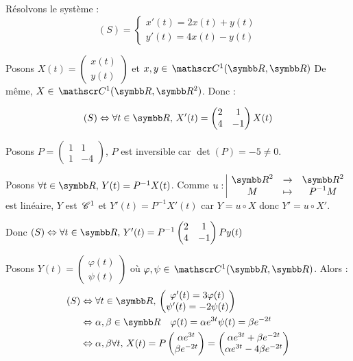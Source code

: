 \begin{exemple}
    Résolvons le système :
    \[(S) = \begin{cases}
        x'(t) = 2x(t) + y(t) \\
        y'(t) = 4x(t) - y(t)
    \end{cases}\]

    Posons $X(t) = \begin{pmatrix} x(t) \\ y(t) \end{pmatrix}$ et $x, y \in \mc 1(\R,\R)$ 
     De même, $X \in \mc 1(\R,\R^2)$. Donc : 
    
    \[(S) \Leftrightarrow \forall t \in \R, \, X'(t) = \begin{pmatrix} 2 & 1 \\ 4 & -1 \end{pmatrix} X(t)\]
    
    Posons $P = \begin{pmatrix} 1 & 1 \\ 1 & -4 \end{pmatrix}$, $P$ est inversible car $\det(P) = -5 \neq 0$.

    Posons $\forall t \in \R, \, Y(t) = P^{-1}X(t)$. Comme $\fonction u {\R^2}{\R^2}{M}{P^{-1}M}$ est linéaire, 
    $Y$ est $\,\mathscr C^{1}$ et $Y'(t) = P^{-1}X'(t)$ car $Y = u \circ X$ donc $Y' = u \circ X'$.

    Donc $(S) \Leftrightarrow \forall t \in \R, \, Y'(t) = P^{-1} \begin{pmatrix} 2 & 1 \\ 4 & -1 \end{pmatrix} P y(t)$

    Posons $Y(t) = \begin{pmatrix} \varphi(t) \\ \psi(t) \end{pmatrix}$ où 
    $\varphi, \psi \in \mc 1(\R,\R)$. Alors : 
    \begin{align*}
        (S) & \Leftrightarrow \forall t \in \R, \, \begin{pmatrix} \varphi'(t)  = 3\varphi(t) \\ \psi'(t) = -2\psi(t) \end{pmatrix}\\
    & \Leftrightarrow \alpha, \beta \in \R \quad \varphi(t) = \alpha e^{3t} \space \psi(t) = \beta e^{-2t}\\
    & \Leftrightarrow \alpha, \beta \forall t, \, X(t) = P \begin{pmatrix} \alpha e^{3t} \\ \beta e^{-2t} \end{pmatrix} = \begin{pmatrix} \alpha e^{3t} + \beta e^{-2t} \\ \alpha e^{3t} - 4\beta e^{-2t} \end{pmatrix}
    \end{align*}
\end{exemple}

